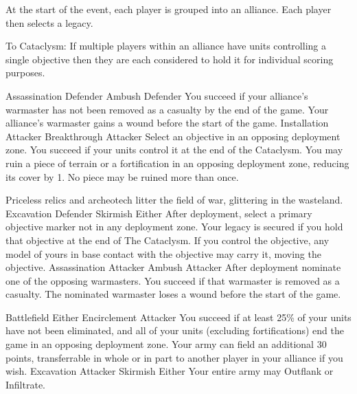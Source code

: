 
At the start of the event, each player is grouped into an alliance.
Each player then selects a legacy.

To Cataclysm: If multiple players within an alliance have units
controlling a single objective then they are each considered to hold
it for individual scoring purposes.

\clearpage
\squelchbackground

\noindent%
%
{}%
{Assassination}%
{Defender}%
{Ambush}%
{Defender}%
{You succeed if your alliance's warmaster has not been removed as a
  casualty by the end of the game.}%
{Your alliance's warmaster gains a wound before the start of the game.}
\hfill
%
{}%
{Installation}%
{Attacker}%
{Breakthrough}%
{Attacker}%
{Select an objective in an opposing deployment zone.
  You succeed if your units control it at the end of the Cataclysm.}%
{You may ruin a piece of terrain or a fortification in an opposing
  deployment zone, reducing its cover by 1.
  No piece may be ruined more than once.}

\vfill

\noindent%
%
{Priceless relics and archeotech litter the field of war, glittering
  in the wasteland.}%
{Excavation}%
{Defender}%
{Skirmish}%
{Either}%
{After deployment, select a primary objective marker not in any
  deployment zone.  Your legacy is secured if you hold that objective
  at the end of The Cataclysm.}%
{If you control the objective, any model of yours in base contact with
  the objective may carry it, moving the objective.}
\hfill
%
{}%
{Assassination}%
{Attacker}%
{Ambush}%
{Attacker}%
{After deployment nominate one of the opposing warmasters.
  You succeed if that warmaster is removed as a casualty.}%
{The nominated warmaster loses a wound before the start of the game.}

\pagebreak

\noindent%
%
{}%
{Battlefield}%
{Either}%
{Encirclement}%
{Attacker}%
{You succeed if at least 25\% of your units have not been eliminated,
  and all of your units (excluding fortifications) end the game in
  an opposing deployment zone.}%
{Your army can field an additional 30 points, transferrable in whole
or in part to another player
in your alliance if you wish.}
\hfill
%
{}%
{Excavation}%
{Attacker}%
{Skirmish}%
{Either}%
{}%
{Your entire army may Outflank or Infiltrate.}

